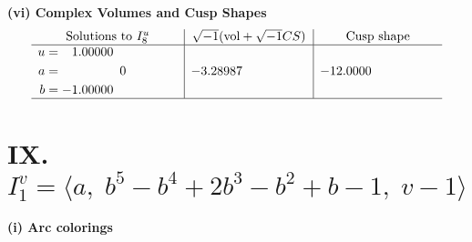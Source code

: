 \documentclass[1p]{elsarticle_modified}
\theoremstyle{definition}
\newcommand{\I}{\sqrt{-1}}
\begin{document}
\newpage\flushleft \textbf{(vi) Complex Volumes and Cusp Shapes}
$$\begin{array}{c|c|c}  
\text{Solutions to }I^u_{8}& \I (\text{vol} + \sqrt{-1}CS) & \text{Cusp shape}\\
 \hline 
\begin{aligned}
u &= \phantom{-}1.00000\phantom{ +0.000000I} \\
a &= \phantom{-0.000000 } 0 \\
b &= -1.00000\phantom{ +0.000000I}\end{aligned}
 & -3.28987\phantom{ +0.000000I} & -12.0000\phantom{ +0.000000I}\\
 \hline 
 \end{array}$$\newpage\newpage\renewcommand{\arraystretch}{1}
\centering \section*{IX. $I^v_{1}= \langle a,\;b^5- b^4+2 b^3- b^2+b-1,\;v-1 \rangle$}
\flushleft \textbf{(i) Arc colorings}\\
\end{document}
